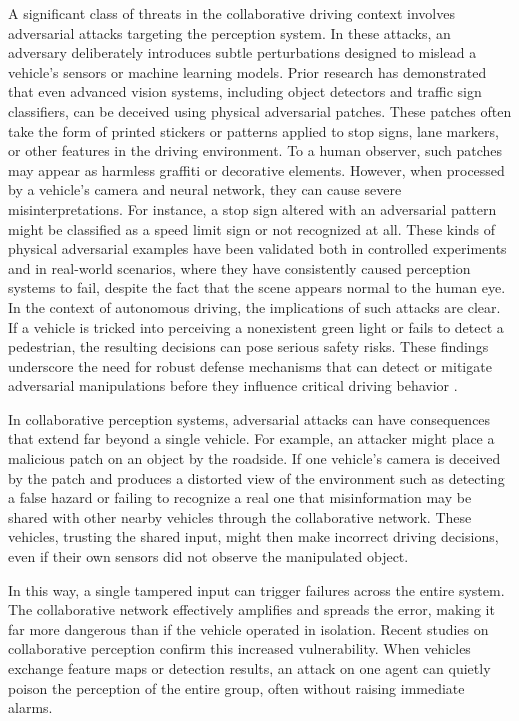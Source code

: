 A significant class of threats in the collaborative driving context involves adversarial attacks targeting the perception system. In these attacks, an adversary deliberately introduces subtle perturbations designed to mislead a vehicle’s sensors or machine learning models.
Prior research has demonstrated that even advanced vision systems, including object detectors and traffic sign classifiers, can be deceived using physical adversarial patches. \cite{pmlr-v80-athalye18b} \cite{brown2018adversarialpatch} \cite{Chen_2019} \cite{goodfellow2015explainingharnessingadversarialexamples} \cite{szegedy2014intriguingpropertiesneuralnetworks} \cite{10.11453319535.3354259}
These patches often take the form of printed stickers or patterns applied to stop signs, lane markers, or other features in the driving environment.
To a human observer, such patches may appear as harmless graffiti or decorative elements. However, when processed by a vehicle’s camera and neural network, they can cause severe misinterpretations.
For instance, a stop sign altered with an adversarial pattern might be classified as a speed limit sign or not recognized at all.
These kinds of physical adversarial examples have been validated both in controlled experiments and in real-world scenarios, where they have consistently caused perception systems to fail, despite the fact that the scene appears normal to the human eye.
In the context of autonomous driving, the implications of such attacks are clear. If a vehicle is tricked into perceiving a nonexistent green light or fails to detect a pedestrian, the resulting decisions can pose serious safety risks. These findings underscore the need for robust defense mechanisms that can detect or mitigate adversarial manipulations before they influence critical driving behavior \cite{zhu2023tpatchtriggeredphysicaladversarial}.

In collaborative perception systems, adversarial attacks can have consequences that extend far beyond a single vehicle. For example, an attacker might place a malicious patch on an object by the roadside. If one vehicle’s camera is deceived by the patch and produces a distorted view of the environment such as detecting a false hazard or failing to recognize a real one that misinformation may be shared with other nearby vehicles through the collaborative network. These vehicles, trusting the shared input, might then make incorrect driving decisions, even if their own sensors did not observe the manipulated object.

In this way, a single tampered input can trigger failures across the entire system. The collaborative network effectively amplifies and spreads the error, making it far more dangerous than if the vehicle operated in isolation. Recent studies on collaborative perception confirm this increased vulnerability. \cite{10.1007978-3-030-58536-5_36} \cite{96294f63afd44ccd9210824e1aa2656c} \cite{hu2022where2commcommunicationefficientcollaborativeperception} \cite{6a619c52e2df4c96ac051544a08e266d} When vehicles exchange feature maps or detection results, an attack on one agent can quietly poison the perception of the entire group, often without raising immediate alarms.

